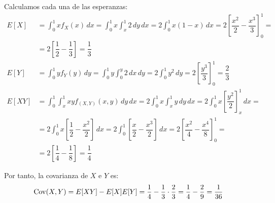 \begin{ejercicio}
\begin{enumerate}
        Calculamos cada una de las esperanzas:
        \begin{align*}
            E[X] &= \int_{0}^{1} xf_X(x) \, dx
            = \int_{0}^{1}x \int_{x}^{1} 2 \, dy \, dx
            = 2\int_{0}^{1}x(1-x) \, dx
            = 2\left[\dfrac{x^2}{2}-\dfrac{x^3}{3}\right]_{0}^{1}
            =\\&= 2\left[\dfrac{1}{2}-\dfrac{1}{3}\right]
            = \dfrac{1}{3} \\
            E[Y] &= \int_{0}^{1} yf_Y(y) \, dy
            = \int_{0}^{1}y \int_{0}^{y} 2 \, dx \, dy
            = 2\int_{0}^{1}y^2 \, dy
            = 2\left[\dfrac{y^3}{3}\right]_{0}^{1}
            = \dfrac{2}{3} \\
            E[XY] &= \int_{0}^{1}\int_{x}^{1} xyf_{(X,Y)}(x,y) \, dy \, dx
            = 2\int_{0}^{1}x \int_{x}^{1} y \, dy \, dx
            = 2\int_{0}^{1}x\left[\dfrac{y^2}{2}\right]_{x}^{1} \, dx
            =\\&= 2\int_{0}^{1}x\left[\dfrac{1}{2}-\dfrac{x^2}{2}\right] \, dx
            = 2\int_{0}^{1}\left[\dfrac{x}{2}-\dfrac{x^3}{2}\right] \, dx
            = 2\left[\dfrac{x^2}{4}-\dfrac{x^4}{8}\right]_{0}^{1}
            =\\&= 2\left[\dfrac{1}{4}-\dfrac{1}{8}\right]
            = \dfrac{1}{4}
        \end{align*}

        Por tanto, la covarianza de $X$ e $Y$ es:
        \begin{align*}
            \operatorname{Cov}(X,Y)&=E[XY]-E[X]E[Y]
            = \dfrac{1}{4}-\dfrac{1}{3}\cdot\dfrac{2}{3}
            = \dfrac{1}{4}-\dfrac{2}{9}
            = \dfrac{1}{36}
        \end{align*}
    \end{enumerate}
\end{ejercicio}